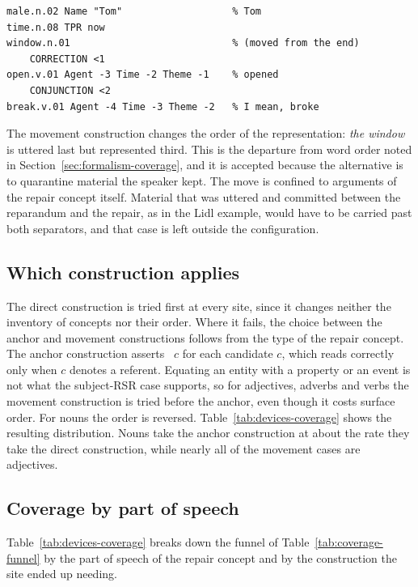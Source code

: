 \begin{lstlisting}[style=sbn]
male.n.02 Name "Tom"                   % Tom
time.n.08 TPR now
window.n.01                            % (moved from the end)
    CORRECTION <1
open.v.01 Agent -3 Time -2 Theme -1    % opened
    CONJUNCTION <2
break.v.01 Agent -4 Time -3 Theme -2   % I mean, broke
\end{lstlisting}

The movement construction changes the order of the representation:
\textit{the window} is uttered last but represented third. This is the
departure from word order noted in
Section~\ref{sec:formalism-coverage}, and it is accepted because the
alternative is to quarantine material the speaker kept. The move is confined to
arguments of the repair concept itself. Material that was uttered and
committed between the reparandum and the repair, as in the Lidl example, would
have to be carried past both separators, and that case is left outside the
configuration.

\subsection{Which construction applies}
\label{app:devices-order}

The direct construction is tried first at every site, since it changes neither
the inventory of concepts nor their order. Where it fails, the choice between
the anchor and movement constructions follows from the type of the repair
concept. The anchor construction asserts
~$c$ for each candidate $c$, which reads correctly
only when $c$ denotes a referent. Equating an entity with a property or an
event is not what the subject-RSR case supports, so for adjectives, adverbs
and verbs the movement construction is tried before the anchor, even though it
costs surface order. For nouns the order is reversed.
Table~\ref{tab:devices-coverage} shows the resulting distribution. Nouns take
the anchor construction at about the rate they take the direct construction,
while nearly all of the movement cases are adjectives.

\subsection{Coverage by part of speech}
\label{app:devices-coverage}

Table~\ref{tab:devices-coverage} breaks down the funnel of
Table~\ref{tab:coverage-funnel} by the part of speech of the repair concept
and by the construction the site ended up needing.

